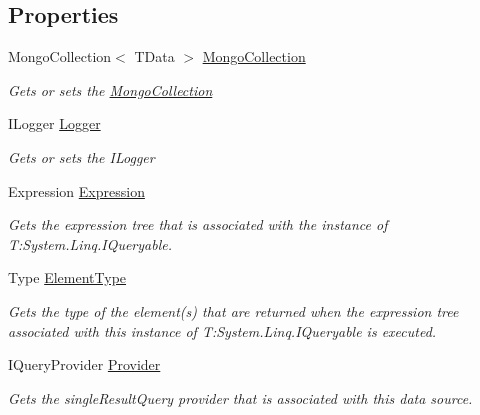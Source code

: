 \subsection*{Properties}
\begin{DoxyCompactItemize}
\item 
Mongo\+Collection$<$ T\+Data $>$ \hyperlink{classCqrs_1_1Mongo_1_1DataStores_1_1MongoDataStore_aa183a8ce44ec16d755f1e4fbe5ec4b10_aa183a8ce44ec16d755f1e4fbe5ec4b10}{Mongo\+Collection}
\begin{DoxyCompactList}\small\item\em Gets or sets the \hyperlink{classCqrs_1_1Mongo_1_1DataStores_1_1MongoDataStore_aa183a8ce44ec16d755f1e4fbe5ec4b10_aa183a8ce44ec16d755f1e4fbe5ec4b10}{Mongo\+Collection} \end{DoxyCompactList}\item 
I\+Logger \hyperlink{classCqrs_1_1Mongo_1_1DataStores_1_1MongoDataStore_a29e943482b60be2d3d253af59d3fc5eb_a29e943482b60be2d3d253af59d3fc5eb}{Logger}
\begin{DoxyCompactList}\small\item\em Gets or sets the I\+Logger \end{DoxyCompactList}\item 
Expression \hyperlink{classCqrs_1_1Mongo_1_1DataStores_1_1MongoDataStore_a1a151694ae4eef805bd64aa7a3ae70ed_a1a151694ae4eef805bd64aa7a3ae70ed}{Expression}
\begin{DoxyCompactList}\small\item\em Gets the expression tree that is associated with the instance of T\+:\+System.\+Linq.\+I\+Queryable. \end{DoxyCompactList}\item 
Type \hyperlink{classCqrs_1_1Mongo_1_1DataStores_1_1MongoDataStore_a0b55d9ca4d8ac206dd7beec30aa123df_a0b55d9ca4d8ac206dd7beec30aa123df}{Element\+Type}
\begin{DoxyCompactList}\small\item\em Gets the type of the element(s) that are returned when the expression tree associated with this instance of T\+:\+System.\+Linq.\+I\+Queryable is executed. \end{DoxyCompactList}\item 
I\+Query\+Provider \hyperlink{classCqrs_1_1Mongo_1_1DataStores_1_1MongoDataStore_ae5de32a7a0da67a8aeaed9653db796ce_ae5de32a7a0da67a8aeaed9653db796ce}{Provider}
\begin{DoxyCompactList}\small\item\em Gets the single\+Result\+Query provider that is associated with this data source. \end{DoxyCompactList}\end{DoxyCompactItemize}



